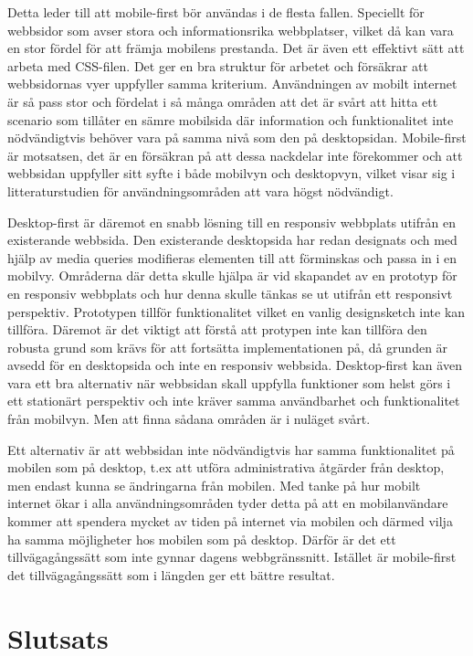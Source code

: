 \documentclass[11pt]{article}
\begin{document}
Detta leder till att mobile-first bör användas i de flesta fallen. Speciellt för webbsidor som avser stora och informationsrika webbplatser, vilket då kan vara en stor fördel för att främja mobilens prestanda. Det är även ett effektivt sätt att arbeta med CSS-filen. Det ger en bra struktur för arbetet och försäkrar att webbsidornas vyer uppfyller samma kriterium. Användningen av mobilt internet är så pass stor och fördelat i så många områden att det är svårt att hitta ett scenario som tillåter en sämre mobilsida där information och funktionalitet inte nödvändigtvis behöver vara på samma nivå som den på desktopsidan. Mobile-first är motsatsen, det är en försäkran på att dessa nackdelar inte förekommer och att webbsidan uppfyller sitt syfte i både mobilvyn och desktopvyn, vilket visar sig i litteraturstudien för användningsområden att vara högst nödvändigt. 

Desktop-first är däremot en snabb lösning till en responsiv webbplats utifrån en existerande webbsida. Den existerande desktopsida har redan designats och med hjälp av media queries modifieras elementen till att förminskas och passa in i en mobilvy. Områderna där detta skulle hjälpa är vid skapandet av en prototyp för en responsiv webbplats och hur denna skulle tänkas se ut utifrån ett responsivt perspektiv. Prototypen tillför funktionalitet vilket en vanlig designsketch inte kan tillföra. Däremot är det viktigt att förstå att protypen inte kan tillföra den robusta grund som krävs för att fortsätta implementationen på, då grunden är avsedd för en desktopsida och inte en responsiv webbsida. Desktop-first kan även vara ett bra alternativ när webbsidan skall uppfylla funktioner som helst görs i ett stationärt perspektiv och inte kräver samma användbarhet och funktionalitet från mobilvyn. Men att finna sådana områden är i nuläget svårt. 

Ett alternativ är att webbsidan inte nödvändigtvis har samma funktionalitet på mobilen som på desktop, t.ex att utföra administrativa åtgärder från desktop, men endast kunna se ändringarna från mobilen. Med tanke på hur mobilt internet ökar i alla användningsområden tyder detta på att en mobilanvändare kommer att spendera mycket av tiden på internet via mobilen och därmed vilja ha samma möjligheter hos mobilen som på desktop. Därför är det ett tillvägagångssätt som inte gynnar dagens webbgränssnitt. Istället är mobile-first det tillvägagångssätt som i längden ger ett bättre resultat.

\newpage
\section{Slutsats}
\end{document}
